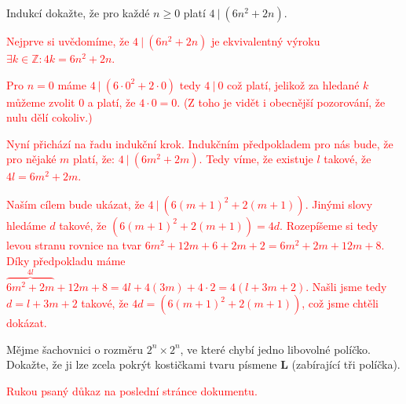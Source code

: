 \documentclass[10pt]{article}
\begin{document}
\begin{problem}[Dělitelnost]
Indukcí dokažte, že pro každé $n \geq 0$ platí $4 \ | \ (6n^2 + 2n)$.

\vspace{5pt}
\noindent
\textcolor{red}{Nejprve si uvědomíme, že $4 \ | \ (6n^2 + 2n)$ je ekvivalentný výroku $\exists k \in \mathbb{Z} : 4 k = 6n^2 + 2n$.}

\vspace{5pt}
\noindent
\textcolor{red}{Pro $n=0$ máme $4 \ | \ (6 \cdot 0^2 + 2 \cdot 0)$ tedy $ 4 \ | \ 0$ což platí, jelikož za hledané $k$ můžeme zvolit $0$ a platí, že $4 \cdot 0 = 0$. (Z toho je vidět i obecnější pozorování, že nulu dělí cokoliv.)}

\vspace{5pt}
\noindent
\textcolor{red}{Nyní přichází na řadu indukční krok. Indukčním předpokladem pro nás bude, že pro nějaké $m$ platí, že: $4 \ | \ (6m^2 + 2m)$. Tedy víme, že existuje $l$ takové, že $4 l = 6m^2 + 2m$.}

\vspace{5pt}
\noindent
\textcolor{red}{Naším cílem bude ukázat, že $ 4 \ | \ (6(m+1)^2 + 2(m+1))$. Jinými slovy hledáme $d$ takové, že $(6(m+1)^2 + 2(m+1)) = 4 d$. Rozepíšeme si tedy levou stranu rovnice na tvar $6m^2 + 12m + 6 + 2m + 2 = 6m^2 + 2m + 12m + 8$. Díky předpokladu máme $\overbrace{6m^2 + 2m}^{4l} + 12m + 8=4l + 4(3m) + 4 \cdot 2=4(l + 3m + 2)$. Našli jsme tedy $d=l+3m+2$ takové, že $4d = (6(m+1)^2 + 2(m+1))$, což jsme chtěli dokázat.}
\end{problem}



\begin{problem}[Šachovnice]
Mějme šachovnici o rozměru $2^n \times 2^n$, ve které chybí jedno libovolné políčko. Dokažte, že ji lze zcela pokrýt kostičkami tvaru písmene \textbf{L} (zabírající tři políčka).

\vspace{5pt}
\noindent
\textcolor{red}{Rukou psaný důkaz na poslední stránce dokumentu.}

\end{problem}
\end{document}
